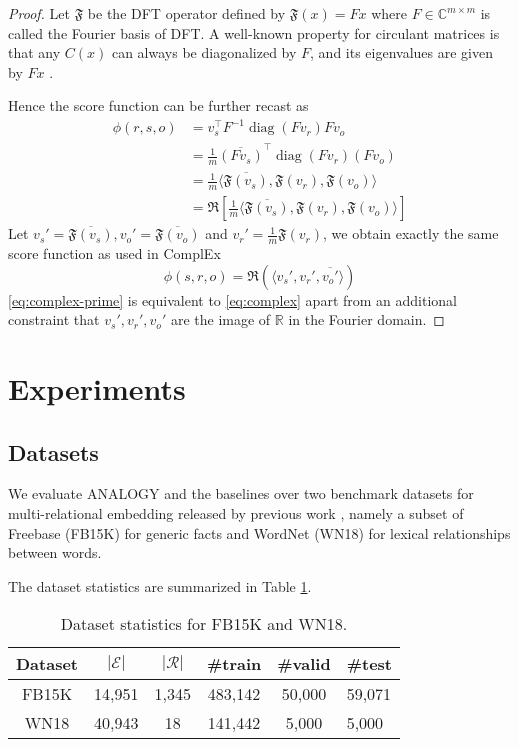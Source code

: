 \documentclass{article}
\newcommand{\diag}{\mathop{\mathrm{diag}}}
\newcommand{\fft}{\mathfrak{F}}
\begin{document}
\begin{proof}
    Let $\fft$ be the DFT operator
    defined by $\fft(x) = Fx$ where $F \in \mathbb{C}^{m \times m}$ is called the Fourier basis of DFT.
    A well-known property for circulant matrices is that any $C(x)$ can always be diagonalized by $F$,
    and its eigenvalues are given by $Fx$ \cite{gray2006toeplitz}.

    Hence the score function can be further recast as
    \begin{align}
        \phi(r, s, o)
        &= v_s^\top F^{-1} \diag(F v_r) F v_o \\
        &= \frac{1}{m} \overline{(F v_s)}^\top \diag(F v_r) (F v_o) \\
        &= \frac{1}{m} \langle \overline{\fft(v_s)}, \fft(v_r), \fft(v_o) \rangle \\
        &= \Re \left[ \frac{1}{m} \langle \overline{\fft(v_s)}, \fft(v_r), \fft(v_o) \rangle \right]
    \end{align}
    Let $v_s' = \overline{\fft(v_s)}, v_o' = \overline{\fft(v_o)}$ and $v_r' = \frac{1}{m} \fft(v_r)$,
    we obtain exactly the same score function as used in ComplEx
    \begin{equation}
        \phi(s, r, o) = \Re \left(\langle v_s', v_r', \overline{v_o'} \rangle\right)
        \label{eq:complex-prime}
    \end{equation}
    \eqref{eq:complex-prime} is equivalent to \eqref{eq:complex}
    apart from an additional constraint that $v_s', v_r', v_o'$ are
    the image of $\mathbb{R}$ in the Fourier domain.
\end{proof}

 \section{Experiments}
\label{sec:experiments}

\subsection{Datasets}
We evaluate ANALOGY and the baselines over two benchmark datasets for multi-relational embedding released by previous work \cite{bordes2013translating},
namely a subset of Freebase (FB15K) for generic facts and WordNet (WN18) for lexical relationships between words.

The dataset statistics are summarized in Table \ref{tab:datasets}.

\begin{table}[h]
    \centering
    \begin{tabularx}{\linewidth}{cccccX}
        \toprule
        Dataset & $|\mathcal{E}|$ & $|\mathcal{R}|$ & \#train & \#valid & \#test \\
        \midrule
        FB15K & 14,951 & 1,345 & 483,142 & 50,000 & 59,071 \\
        WN18 & 40,943 & 18 & 141,442 & 5,000 & 5,000 \\
        \bottomrule
    \end{tabularx}
    \caption{Dataset statistics for FB15K and WN18.}
    \label{tab:datasets}
\end{table}
\end{document}
